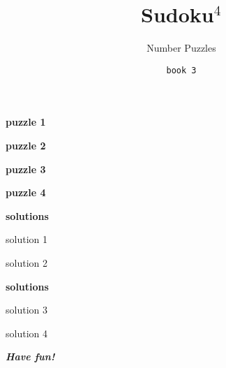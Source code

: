 \documentclass[fontsize=24pt,letterpaper]{scrartcl}
\title{Sudoku$^4$}
\author{Number Puzzles}
\date{\texttt{book 3}}
\renewcommand*\sudokuformat[1]{\Large\sffamily#1}
\begin{document}
\maketitle
\setcounter{page}{0}
\thispagestyle{empty}
\clearpage

{\Large \bfseries \sffamily puzzle 1}
\vspace{2cm}

\clearpage
\begin{flushright}
{\Large \bfseries \sffamily puzzle 2}
\end{flushright}
\vspace{1cm}


\clearpage
{\Large \bfseries \sffamily puzzle 3}
\vspace{2cm}


\clearpage
\begin{flushright}
{\Large \bfseries \sffamily puzzle 4}
\end{flushright}
\vspace{1cm}


\clearpage

{\Large \bfseries \sffamily solutions}
\setlength\sudokusize{8cm}
\renewcommand*\sudokuformat[1]{\sffamily#1}
\vspace{1cm}

\begin{center}
    solution 1
\end{center}
\vspace{0.2cm}

\begin{center}
    solution 2
\end{center}


\clearpage
\begin{flushright}
{\Large \bfseries \sffamily solutions}
\end{flushright}
\vspace{1cm}

\begin{center}
    solution 3
\end{center}

\begin{center}
    solution 4
\end{center}
\clearpage

{\centering\Huge\itshape\bfseries Have fun!\par}
\end{document}
